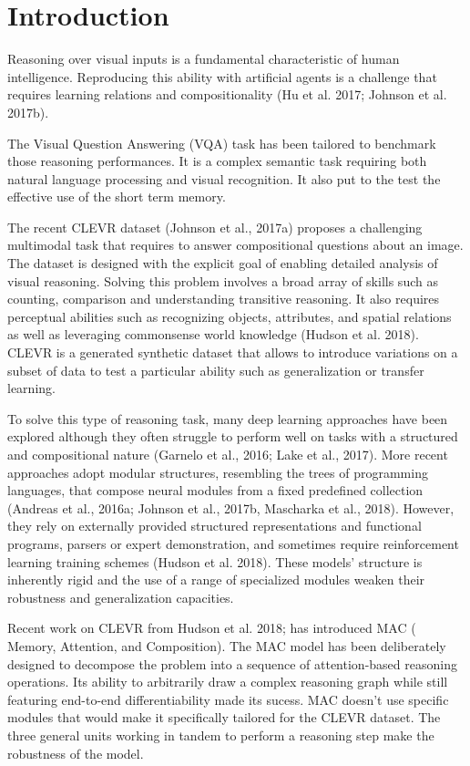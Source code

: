 \section{Introduction}
Reasoning over visual inputs is a fundamental characteristic of human intelligence.
Reproducing this ability with artificial agents is a challenge that requires learning relations and compositionality (Hu et al. 2017; Johnson et al. 2017b).

The Visual Question Answering (VQA) task has been tailored to benchmark those reasoning performances. It is a complex semantic task requiring both natural language processing and visual recognition. It also put to the test the effective use of the short term memory.

The recent CLEVR dataset (Johnson et al., 2017a) proposes a challenging multimodal task that requires to answer compositional questions about an image. The dataset is designed with the explicit goal of enabling detailed analysis of visual reasoning.
Solving this problem involves a broad array of skills such as counting, comparison and understanding transitive reasoning.
It also requires perceptual abilities such as recognizing objects, attributes, and spatial relations as well as leveraging commonsense world knowledge (Hudson et al. 2018).
CLEVR is a generated synthetic dataset that allows to introduce variations on a subset of data to test a particular ability such as generalization or transfer learning.

To solve this type of reasoning task, many deep learning approaches have been explored although they often struggle to perform well on tasks with a structured and compositional nature (Garnelo et al., 2016; Lake et al., 2017). 
More recent approaches adopt modular structures, resembling the trees of programming languages, that compose neural modules from a fixed predefined collection (Andreas et al., 2016a; Johnson et al., 2017b, Mascharka et al., 2018). However, they rely on externally provided structured representations and functional programs, parsers or expert demonstration, and sometimes require reinforcement learning training schemes (Hudson et al. 2018). 
These models’ structure is inherently rigid and the use of a range of specialized modules weaken their robustness and generalization capacities.

Recent work on CLEVR from Hudson et al. 2018;  has introduced  MAC ( Memory, Attention, and Composition). The MAC model has been deliberately designed to decompose the problem into a sequence of attention-based reasoning operations. Its ability to arbitrarily draw a complex reasoning graph while still featuring end-to-end differentiability made its sucess.
MAC doesn’t use specific modules that would make it specifically tailored for the CLEVR dataset. The three general units working in tandem to perform a reasoning step make the robustness of the model.

